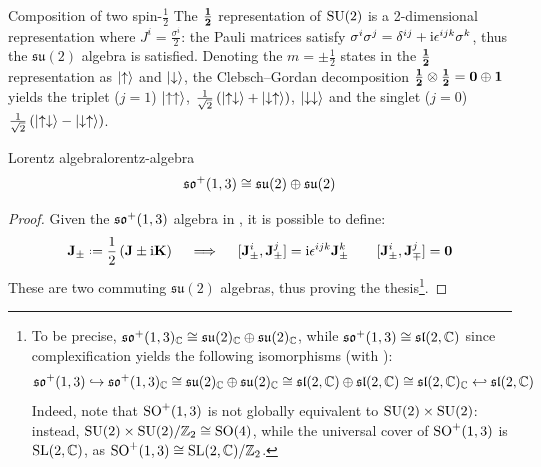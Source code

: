 \begin{example}{Composition of two spin-$ \frac{1}{2} $}{}
  The $ \mathbf{\frac{1}{2}} $ representation of $ \mathrm{SU}(2) $ is a 2-dimensional representation where $ J^i = \frac{\sigma^i}{2} $: the Pauli matrices satisfy $ \sigma^i \sigma^j = \delta^{ij} + \mathrm{i} \epsilon^{ijk} \sigma^k $, thus the $ \mathfrak{su}(2) $ algebra is satisfied. Denoting the $ m = \pm \frac{1}{2} $ states in the $ \mathbf{\frac{1}{2}} $ representation as $ \ket{\uparrow} $ and $ \ket{\downarrow} $, the Clebsch--Gordan decomposition $ \mathbf{\frac{1}{2}} \otimes \mathbf{\frac{1}{2}} = \mathbf{0} \oplus \mathbf{1} $ yields the triplet ($ j = 1 $) $ \ket{\uparrow\uparrow} $, $ \frac{1}{\sqrt{2}}\left( \ket{\uparrow\downarrow} + \ket{\downarrow\uparrow} \right) $, $ \ket{\downarrow\downarrow} $ and the singlet ($ j = 0 $) $ \frac{1}{\sqrt{2}}\left( \ket{\uparrow\downarrow} - \ket{\downarrow\uparrow} \right) $.
\end{example}

\begin{proposition}[before upper = {\tcbtitle}]{Lorentz algebra}{lorentz-algebra}
  \begin{equation}
    \mathfrak{so}^+(1,3) \cong \mathfrak{su}(2) \oplus \mathfrak{su}(2)
  \end{equation}
\end{proposition}

\begin{proofbox}
  \begin{proof}
    Given the $ \mathfrak{so}^+(1,3) $ algebra in , it is possible to define:
    \begin{equation}
      \ve{J}_{\pm} \defeq \frac{1}{2} \left( \ve{J} \pm \img \ve{K} \right)
      \quad \implies \quad
      [\ve{J}_{\pm}^i , \ve{J}_{\pm}^j] = \img \epsilon^{ijk} \ve{J}_{\pm}^k
      \qquad
      [\ve{J}_{\pm}^i , \ve{J}_{\mp}^j] = \ve{0}
      \label{eq:lora-su2-gen}
    \end{equation}
    These are two commuting $ \mathfrak{su}(2) $ algebras, thus proving the thesis\footnote{To be precise, $ \mathfrak{so}^+(1,3)_{\mathbb{C}} \cong \mathfrak{su}(2)_{\mathbb{C}} \oplus \mathfrak{su}(2)_{\mathbb{C}} $, while $ \mathfrak{so}^+(1,3) \cong \mathfrak{sl}(2,\mathbb{C}) $ since complexification yields the following isomorphisms (with ):
    \begin{equation*}
      \mathfrak{so}^+(1,3) \hookrightarrow \mathfrak{so}^+(1,3)_{\mathbb{C}} \cong \mathfrak{su}(2)_{\mathbb{C}} \oplus \mathfrak{su}(2)_{\mathbb{C}} \cong \mathfrak{sl}(2,\mathbb{C}) \oplus \mathfrak{sl}(2,\mathbb{C}) \cong \mathfrak{sl}(2,\mathbb{C})_{\mathbb{C}} \hookleftarrow \mathfrak{sl}(2,\mathbb{C})
    \end{equation*}
    Indeed, note that $ \mathrm{SO}^+(1,3) $ is not globally equivalent to $ \mathrm{SU}(2) \times \mathrm{SU}(2) $: instead, $ \mathrm{SU}(2) \times \mathrm{SU}(2) / \mathbb{Z}_2 \cong \mathrm{SO}(4) $, while the universal cover of $ \mathrm{SO}^+(1,3) $ is $ \mathrm{SL}(2,\mathbb{C}) $, as $ \mathrm{SO}^+(1,3) \cong \mathrm{SL}(2,\mathbb{C}) / \mathbb{Z}_2 $.}.
  \end{proof}
\end{proofbox}

